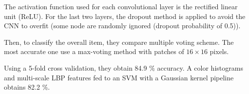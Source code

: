 The activation function used for each convolutional layer is the rectified linear unit (ReLU). For the last two layers, the dropout method is applied to avoid the CNN to overfit (some node are randomly ignored (dropout probability of 0.5)).

Then, to classify the overall item, they compare multiple voting scheme. The most accurate one use a max-voting method with patches of $16 \times 16$ pixels.

Using a 5-fold cross validation, they obtain 84.9 \% accuracy. A color histograms and multi-scale LBP features fed to an SVM with a Gaussian kernel pipeline obtains 82.2 \%.